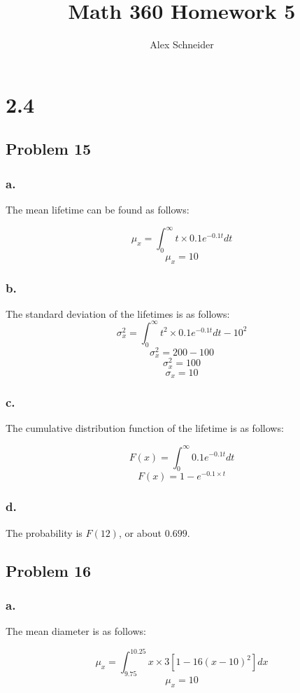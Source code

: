\documentclass[11pt]{article}
\title{Math 360 Homework 5}
\author{Alex Schneider}
\begin{document}
\maketitle

\section{2.4}
\subsection{Problem 15}
\subsubsection{a.}
The mean lifetime can be found as follows:

\[ \mu_x = \int_0^\infty t \times 0.1e^{-0.1t} dt \]
\[ \mu_x = 10 \]

\subsubsection{b.}
The standard deviation of the lifetimes is as follows:
\[ \sigma^2_x = \int_0^{\infty}{t^2 \times 0.1e^{-0.1t}}dt - 10^2 \]
\[ \sigma^2_x = 200 - 100 \]
\[ \sigma^2_x = 100 \]
\[ \sigma_x = 10 \]

\subsubsection{c.}
The cumulative distribution function of the lifetime is as follows:

\[ F(x) = \int_{0}^{\infty}0.1e^{-0.1t}dt \]
\[ F(x) = 1 - e^{-0.1\times t} \]

\subsubsection{d.}
The probability is $F(12)$, or about $0.699$. 

\subsection{Problem 16}
\subsubsection{a.}
The mean diameter is as follows:

\[ \mu_x = \int_{9.75}^{10.25}x \times 3\left[ 1 - 16\left( x - 10 \right)^2 \right]dx \]
\[ \mu_x = 10 \]
\end{document}
